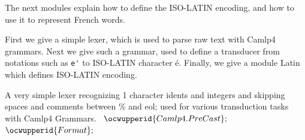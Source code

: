 \documentclass[12pt]{article}
\begin{document}
The next modules explain how to define the ISO-LATIN encoding, and
how to use it to represent French words. 

First we give a simple lexer, which is used to parse raw text with
Camlp4 grammars. Next we give such a grammar, used to define a
transducer from notations such as \verb:e': to ISO-LATIN character
\'e. Finally, we give a module Latin which defines ISO-LATIN encoding.



\label{../ML/zen_lexer.ml:0}%
A very simple lexer recognizing 1 character idents and integers 
   and skipping spaces and comments between \ocwbegindcode{}\%\ocwenddcode{} and eol; 
   used for various transduction tasks with Camlp4 Grammars. 
\ocweol
\label{../ML/zen_lexer.ml:843}%
\medskip
\ocwbegincode{}\ocwindent{0.00em}
~$\ocwupperid{Camlp4.PreCast};$\ocweol
\ocwindent{0.00em}
~$\ocwupperid{Format};$\medskip
\end{document}
